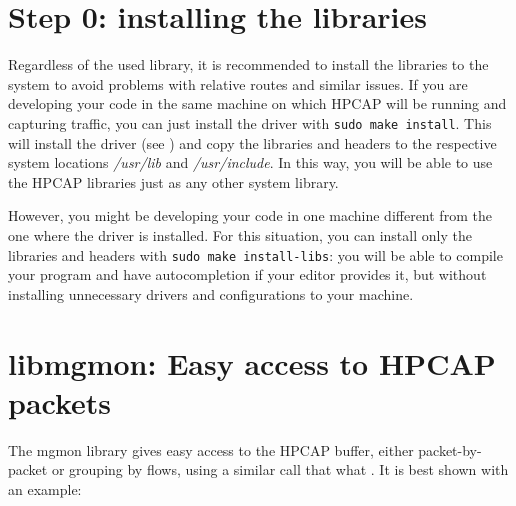 \documentclass[a4paper,oneside]{hpman}
\begin{document}
\section{Step 0: installing the libraries}

Regardless of the used library, it is recommended to install the libraries to the system to avoid problems with relative routes and similar issues. If you are developing your code in the same machine on which HPCAP will be running and capturing traffic, you can just install the driver with \texttt{sudo make install}. This will install the driver (see ) and copy the libraries and headers to the respective system locations \textit{/usr/lib} and \textit{/usr/include}. In this way, you will be able to use the HPCAP libraries just as any other system library.

However, you might be developing your code in one machine different from the one where the driver is installed. For this situation, you can install only the libraries and headers with \texttt{sudo make install-libs}: you will be able to compile your program and have autocompletion if your editor provides it, but without installing unnecessary drivers and configurations to your machine.

\section{libmgmon: Easy access to HPCAP packets}

The mgmon library gives easy access to the HPCAP buffer, either packet-by-packet or grouping by flows, using a similar call that what . It is best shown with an example:
\end{document}
